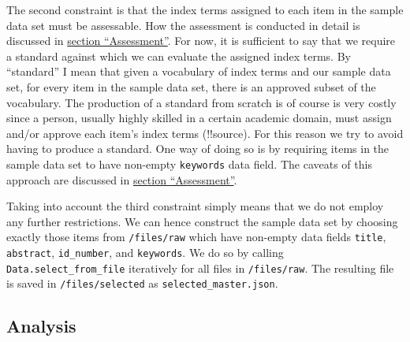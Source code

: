 The second constraint is that the index terms assigned to each item in
the sample data set must be assessable. How the assessment is conducted
in detail is discussed in \protect\hyperlink{assessment}{section
``Assessment''}. For now, it is sufficient to say that we require a
standard against which we can evaluate the assigned index terms. By
``standard'' I mean that given a vocabulary of index terms and our
sample data set, for every item in the sample data set, there is an
approved subset of the vocabulary. The production of a standard from
scratch is of course is very costly since a person, usually highly
skilled in a certain academic domain, must assign and/or approve each
item's index terms (!!source). For this reason we try to avoid having to
produce a standard. One way of doing so is by requiring items in the
sample data set to have non-empty \texttt{keywords} data field. The
caveats of this approach are discussed in
\protect\hyperlink{assessment}{section ``Assessment''}.

Taking into account the third constraint simply means that we do not
employ any further restrictions. We can hence construct the sample data
set by choosing exactly those items from \texttt{/files/raw} which have
non-empty data fields \texttt{title}, \texttt{abstract},
\texttt{id\_number}, and \texttt{keywords}. We do so by calling
\texttt{Data.select\_from\_file} iteratively for all files in
\texttt{/files/raw}. The resulting file is saved in
\texttt{/files/selected} as \texttt{selected\_master.json}.

\hypertarget{analysis}{%
\subsection{Analysis}\label{analysis}}

